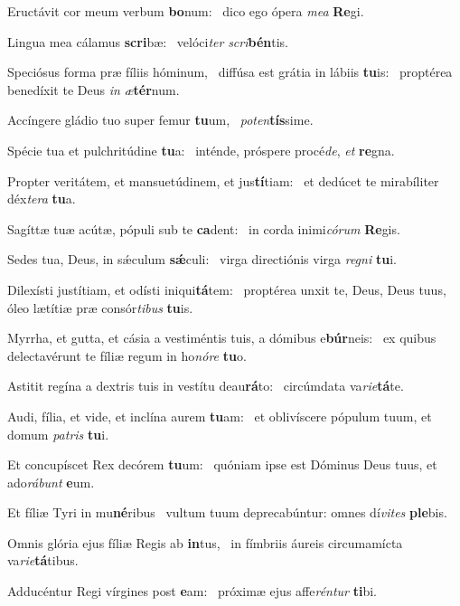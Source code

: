 \item Eructávit cor meum verbum \textbf{bo}num:~\psstar{} dico ego ópera \textit{mea} \textbf{Re}gi.
\item Lingua mea cálamus \textbf{scri}bæ:~\psstar{} velóci\textit{ter} \textit{scri}\textbf{bén}tis.
\item Speciósus forma præ fíliis hóminum,~\pscross{} diffúsa est grátia in lábiis \textbf{tu}is:~\psstar{} proptérea benedíxit te Deus \textit{in} \textit{æ}\textbf{tér}num.
\item Accíngere gládio tuo super femur \textbf{tu}um,~\psstar{} \textit{poten}\textbf{tís}sime.
\item Spécie tua et pulchritúdine \textbf{tu}a:~\psstar{} inténde, próspere procé\textit{de}, \textit{et} \textbf{re}gna.
\item Propter veritátem, et mansuetúdinem, et jus\textbf{tí}tiam:~\psstar{} et dedúcet te mirabíliter déx\textit{tera} \textbf{tu}a.
\item Sagíttæ tuæ acútæ, pópuli sub te \textbf{ca}dent:~\psstar{} in corda inimi\textit{córum} \textbf{Re}gis.
\item Sedes tua, Deus, in sǽculum \textbf{sǽ}culi:~\psstar{} virga directiónis virga \textit{regni} \textbf{tu}i.
\item Dilexísti justítiam, et odísti iniqui\textbf{tá}tem:~\psstar{} proptérea unxit te, Deus, Deus tuus, óleo lætítiæ præ consór\textit{tibus} \textbf{tu}is.
\item Myrrha, et gutta, et cásia a vestiméntis tuis, a dómibus e\textbf{búr}neis:~\psstar{} ex quibus delectavérunt te fíliæ regum in ho\textit{nóre} \textbf{tu}o.
\item Astitit regína a dextris tuis in vestítu deau\textbf{rá}to:~\psstar{} circúmdata va\textit{rie}\textbf{tá}te.
\item Audi, fília, et vide, et inclína aurem \textbf{tu}am:~\psstar{} et oblivíscere pópulum tuum, et domum \textit{patris} \textbf{tu}i.
\item Et concupíscet Rex decórem \textbf{tu}um:~\psstar{} quóniam ipse est Dóminus Deus tuus, et ado\textit{rábunt} \textbf{e}um.
\item Et fíliæ Tyri in mu\textbf{né}ribus~\psstar{} vultum tuum deprecabúntur: omnes dí\textit{vites} \textbf{ple}bis.
\item Omnis glória ejus fíliæ Regis ab \textbf{in}tus,~\psstar{} in fímbriis áureis circumamícta va\textit{rie}\textbf{tá}tibus.
\item Adducéntur Regi vírgines post \textbf{e}am:~\psstar{} próximæ ejus affe\textit{réntur} \textbf{ti}bi.
